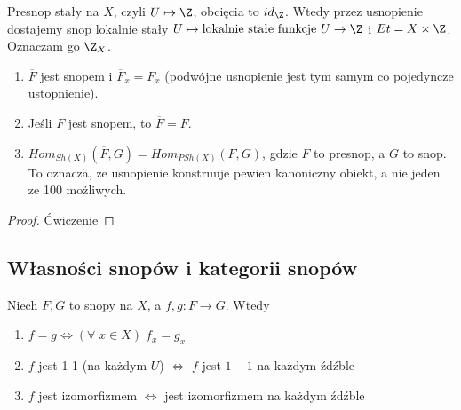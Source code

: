 \begin{example}
  \item Presnop stały na $X$, czyli $U\mapsto \Z$, obcięcia to $id_{\Z}$. Wtedy przez usnopienie dostajemy snop lokalnie stały $U\mapsto \text{lokalnie stałe funkcje }U\to \Z$ i $Et=X\times \Z$. Oznaczam go $\Z_X$.
\end{example}

\begin{fact}
  \begin{enumerate}
    \item $\overline{F}$ jest snopem i $\overline{F}_x=F_x$ (podwójne usnopienie jest tym samym co pojedyncze ustopnienie).
    \item Jeśli $F$ jest snopem, to $\overline{F}=F$.
    \item $Hom_{Sh(X)}(\overline{F}, G)=Hom_{PSh(X)}(F, G)$, gdzie $F$ to presnop, a $G$ to snop. To oznacza, że usnopienie konstruuje pewien kanoniczny obiekt, a nie jeden ze 100 możliwych.
  \end{enumerate}
\end{fact}

\begin{proof}
  Ćwiczenie
\end{proof}

\subsection{Własności snopów i kategorii snopów}

\begin{fact}
  Niech $F, G$ to snopy na $X$, a $f,g:F\to G$. Wtedy
  \begin{enumerate}
    \item $f=g\iff (\forall\;x\in X)\;f_x=g_x$
    \item $f$ jest 1-1 (na każdym $U$) $\iff$ $f$ jest $1-1$ na każdym źdźble
    \item $f$ jest izomorfizmem $\iff$ jest izomorfizmem na każdym źdźble
  \end{enumerate}
\end{fact}

